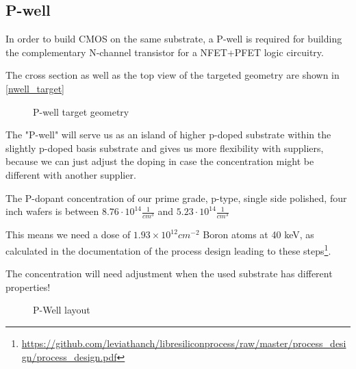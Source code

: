 \subsection{P-well}\label{pwell_chapter}

In order to build CMOS on the same substrate, a P-well is required for building the complementary N-channel transistor for a NFET+PFET logic circuitry.

The cross section as well as the top view of the targeted geometry are shown in \autoref{nwell_target}

\begin{figure}[H]
	\centering
	\begin{tikzpicture}[node distance = 3cm, auto, thick,scale=\CrossAndTopSectionBig, every node/.style={transform shape}]
		
	\end{tikzpicture}
	\begin{tikzpicture}[node distance = 3cm, auto, thick,scale=\CrossAndTopSectionBig, every node/.style={transform shape}]
		
	\end{tikzpicture}
	\caption{P-well target geometry}
	\label{pwell_target}
\end{figure}

The "P-well" will serve us as an island of higher p-doped substrate within the slightly p-doped basis substrate and gives us more flexibility with suppliers, because we can just adjust the doping in case the concentration might be different with another supplier.

The P-dopant concentration of our prime grade, p-type, single side polished, four inch wafers is between $8.76 \cdot 10^14 \frac{1}{cm^3}$ and $5.23 \cdot 10^14 \frac{1}{cm^3}$

This means we need a dose of $1.93\times10^{12}cm^{-2}$ Boron atoms at 40 keV, as calculated in the documentation of the process design leading to these steps\footnote{\url{https://github.com/leviathanch/libresiliconprocess/raw/master/process_design/process_design.pdf}}.

The concentration will need adjustment when the used substrate has different properties!

\begin{figure}[H]
	\centering
	\begin{tikzpicture}[node distance =1cm, auto, thick,scale=\VLSILayout, every node/.style={transform shape}]
		
	\end{tikzpicture}
	\caption{P-Well layout}
	\label{pwell_layout}
\end{figure}

